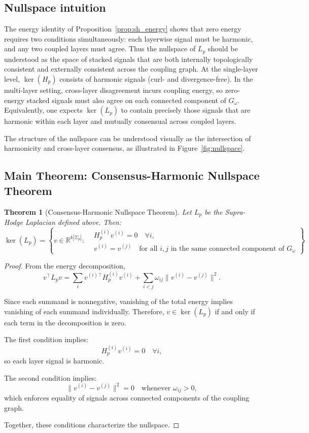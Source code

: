 \documentclass[11pt]{article}
\newtheorem{theorem}{Theorem}[section]
\theoremstyle{definition}
\theoremstyle{remark}
\newcommand{\Gom}{G_\omega}
\begin{document}
\subsection{Nullspace intuition}

The energy identity of Proposition~\ref{prop:sh_energy} shows that zero energy requires two conditions simultaneously: each layerwise signal must be harmonic, and any two coupled layers must agree. Thus the nullspace of $L_p$ should be understood as the space of stacked signals that are both internally topologically consistent and externally consistent across the coupling graph. At the single-layer level, $\ker(H_p)$ consists of harmonic signals (curl- and divergence-free). In the multi-layer setting, cross-layer disagreement incurs coupling energy, so zero-energy stacked signals must also agree on each connected component of $\Gom$. Equivalently, one expects $\ker(L_p)$ to contain precisely those signals that are harmonic within each layer and mutually consensual across coupled layers.

The structure of the nullspace can be understood visually as the intersection
of harmonicity and cross-layer consensus, as illustrated in
Figure~\ref{fig:nullspace}.

\FigureASix

\subsection{Main Theorem: Consensus-Harmonic Nullspace Theorem}

\begin{theorem}[Consensus-Harmonic Nullspace Theorem]
\label{thm:main}
Let $L_p$ be the Supra-Hodge Laplacian defined above. Then:
\[
\ker(L_p)
=
\left\{
v \in \mathbb{R}^{k|\Sigma_p|} :
\begin{aligned}
& H_p^{(i)} v^{(i)} = 0 \quad \forall i, \\
& v^{(i)} = v^{(j)} \quad \text{for all } i,j \text{ in the same connected component of } G_\omega
\end{aligned}
\right\}.
\]
\end{theorem}

\begin{proof}
From the energy decomposition,
\[
v^\top L_p v
=
\sum_i v^{(i)\top} H_p^{(i)} v^{(i)}
+
\sum_{i<j} \omega_{ij} \|v^{(i)} - v^{(j)}\|^2.
\]

Since each summand is nonnegative, vanishing of the total energy implies vanishing of each summand individually. Therefore, $v \in \ker(L_p)$ if and only if each term in the decomposition is zero.

The first condition implies:
\[
H_p^{(i)} v^{(i)} = 0 \quad \forall i,
\]
so each layer signal is harmonic.

The second condition implies:
\[
\|v^{(i)} - v^{(j)}\|^2 = 0 \quad \text{whenever } \omega_{ij} > 0,
\]
which enforces equality of signals across connected components of the coupling graph.

Together, these conditions characterize the nullspace.
\end{proof}
\end{document}
